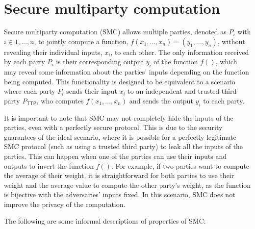 \section{Secure multiparty computation}

Secure multiparty computation (SMC) allows multiple parties, denoted as $P_i$ with $i \in {1,\ldots,n}$, to jointly compute a function, $f(x_1,\dots,x_n) = (y_1,\ldots,y_n)$, without revealing their individual inputs, $x_i$, to each other. The only information received by each party $P_i$ is their corresponding output $y_i$ of the function $f()$, which may reveal some information about the parties' inputs depending on the function being computed. This functionality is designed to be equivalent to a scenario where each party $P_i$ sends their input $x_i$ to an independent and trusted third party $P_{\mathsf{TTP}}$, who computes $f(x_1,\ldots,x_n)$ and sends the output $y_i$ to each party.

It is important to note that SMC may not completely hide the inputs of the parties, even with a perfectly secure protocol. This is due to the security guarantees of the ideal scenario, where it is possible for a perfectly legitimate SMC protocol (such as using a trusted third party) to leak all the inputs of the parties. This can happen when one of the parties can use their inputs and outputs to invert the function $f()$. For example, if two parties want to compute the average of their weight, it is straightforward for both parties to use their weight and the average value to compute the other party's weight, as the function is bijective with the adversaries' inputs fixed. In this scenario, SMC does not improve the privacy of the computation.
%

The following are some informal descriptions of properties of SMC:

